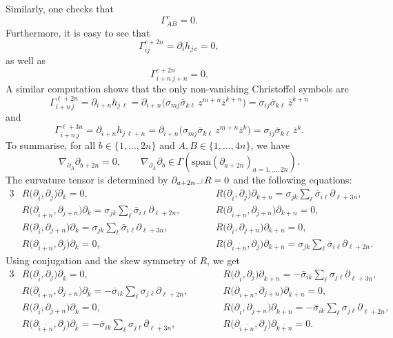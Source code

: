 \documentclass[pdftex]{sigma}
\numberwithin{equation}{section}
\newcommand{\1}{\mathbf{1}}
\newcommand{\ol}{\overline}
\newcommand{\+}{\oplus}
\newcommand{\del}{\partial}
\renewcommand{\=}{\equiv}
\newcommand{\hook}{\makebox[7pt]{\rule{6pt}{.3pt}\rule{.3pt}{5pt}}\,}
\begin{document}
Similarly,
one
checks that
\[\Gamma^{c}_{AB} =0.\]
Furthermore, it is easy to see that
\[
\Gamma^{c+2n}_{i j}= \partial_{i}h_{j\, c}=0, \]
as well as
\[
\Gamma^{c+2n}_{i+n\,j+n}=0.
\]
A similar computation shows that the only non-vanishing Christoffel symbols are
\[
\Gamma^{\ell+2n}_{i+n\, j}
 =
 \partial_{i+n} h_{ j\, \ell}
 =
 \partial_{i+n} \bigl(
 \sigma_{mj}\bar{\sigma}_{k\ell}\,
 z^{m+n}\ol{z}^{k+n}\bigr)
 =
 \sigma_{ij}\bar{\sigma}_{k\ell}\,
\ol{z}^{k+n}
\]
and
 \[ \Gamma^{\ell+3n}_{i+n\, j}
 =
 \partial_{i+n} h_{ j\, \ell+n}
 =
 \partial_{i+n} \bigl(
 \sigma_{mj}\bar{\sigma}_{k\ell}\,
 z^{m+n}\ol{z}^{k} \bigr)
 =
 \sigma_{ij}\bar{\sigma}_{k\ell}\,
\ol{z}^{k} .\]
To summarise, for all $b\in \{1, \ldots, 2n\}$ and $A,B\in \{1, \ldots, 4n\}$, we have
\begin{equation}
\label{LC1}
\nabla_{\partial_A}\partial_{b+2n}=0,\qquad
\nabla_{\partial_A}\partial_b \in \Gamma (\mathrm{span} (\partial_{a+2n})_{a=1,\ldots, 2n}).\end{equation}
The curvature tensor is determined by ${\del_{a+2n}\hook R=0}$ and the following equations:
\begin{alignat*}{3}
&R\bigl(\del_{\overline{i}},\del_{j}\bigr)\del_{k} = 0,\qquad&& R\bigl(\del_{\overline{i}},\del_{j}\bigr)\del_{k+n} = \sigma_{jk}\sum_{\ell}\bar{\sigma}_{i\ell} \del_{\ell+3n},&
\\
&R\bigl(\del_{\overline{i+n}},\del_{j+n}\bigr)\del_{k} = \sigma_{jk}\sum_{\ell}\bar{\sigma}_{i\ell} \del_{\ell+2n},\qquad&& R\bigl(\del_{\overline{i+n}},\del_{j+n}\bigr)\del_{k+n} = 0,&
\\
&R\bigl(\del_{\overline{i}},\del_{j+n}\bigr)\del_{k} = \sigma_{jk}\sum_{\ell}\bar{\sigma}_{i\ell} \del_{\ell+3n},\qquad&& R\bigl(\del_{\overline{i}},\del_{j+n}\bigr)\del_{k+n} = 0,&
\\
&R\bigl(\del_{\overline{i+n}},\del_{j}\bigr)\del_{k} = 0,\qquad&& R\bigl(\del_{\overline{i+n}},\del_{j}\bigr)\del_{k+n} =
\sigma_{jk}\sum_{\ell}\bar{\sigma}_{i\ell} \del_{\ell+2n}.&
\end{alignat*}
Using conjugation and the skew symmetry of $R$, we get
\begin{alignat*}{3}
&R\bigl(\del_{\overline{i}},\del_{j}\bigr)\del_{\overline{k}} = 0,\qquad&& R\bigl(\del_{\overline{i}},\del_{j}\bigr)\del_{\overline{k+n}} = -\bar{\sigma}_{ik}\sum_{\ell}{\sigma}_{j\ell} \del_{\overline{\ell+3n}},&
\\
&R\bigl(\del_{\overline{i+n}},\del_{j+n}\bigr)\del_{\overline{k}} = -\bar{\sigma}_{ik}\sum_{\ell}{\sigma}_{j\ell} \del_{\overline{\ell+2n}}, \qquad&& R\bigl(\del_{\overline{i+n}},\del_{j+n}\bigr)\del_{\overline{k+n}} = 0,&
\\
&R\bigl(\del_{\overline{i}},\del_{j+n}\bigr)\del_{\overline{k}} = 0,\qquad&& R\bigl(\del_{\overline{i}},\del_{j+n}\bigr)\del_{\overline{k+n}} =
-\bar{\sigma}_{ik}\sum_{\ell}{\sigma}_{j\ell} \del_{\overline{\ell+2n}},&
\\
&R\bigl(\del_{\overline{i+n}},\del_{j}\bigr)\del_{\overline{k}} =
-\bar{\sigma}_{ik}\sum_{\ell}{\sigma}_{j\ell} \del_{\overline{\ell+3n}},\qquad&& R\bigl(\del_{\overline{i+n}},\del_{j}\bigr)\del_{\overline{k+n}} =0.&
\end{alignat*}
\end{document}
